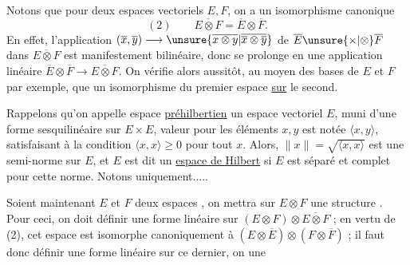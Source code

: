 Notons que pour deux espaces vectoriels $E,F$, on a un isomorphisme canonique
\[
(2)\qquad\overline{E\otimes F}=\overline E\otimes\overline F.
\]
En effet, l'application $(\overline x,\overline y)\longrightarrow\unsure{\overline{x\otimes y}|\overline{\overline x\otimes\overline y}}$ de $\overline E\unsure{\times|\otimes}\overline F$ dans $\overline{E\otimes F}$ est manifestement bilinéaire, donc se prolonge en une application linéaire $\overline E\otimes\overline F\longrightarrow\overline{E\otimes F}$.
On vérifie alors aussitôt, au moyen des bases de $E$ et $F$ par exemple, que  un isomorphisme du premier espace \uline{sur} le second.

 Rappelons qu'on appelle espace \uline{préhilbertien} un espace vectoriel $E$, muni d'une forme sesquilinéaire sur $E\times E$,   valeur pour les éléments $x,y$ est notée $\langle x,y\rangle$, satisfaisant à la condition $\langle x,x\rangle\geq0$ pour tout $x$. Alors,
$\|x\|=\sqrt{\langle x,x\rangle}$ est une semi-norme sur $E$, et $E$ est dit un \uline{espace de Hilbert} si $E$ est séparé et complet pour cette norme.
Notons uniquement.....


Soient maintenant $E$ et $F$ deux espaces  , on mettra sur $E\otimes F$ une structure   .
Pour ceci, on doit définir une forme linéaire sur $(E\otimes F)\otimes\overline{E\otimes F}$ ;  en vertu de (2),  cet espace est isomorphe canoniquement à $(E\otimes\overline E)\otimes(F\otimes\overline F)$ ; il faut donc définir une forme linéaire sur ce dernier, on  une
